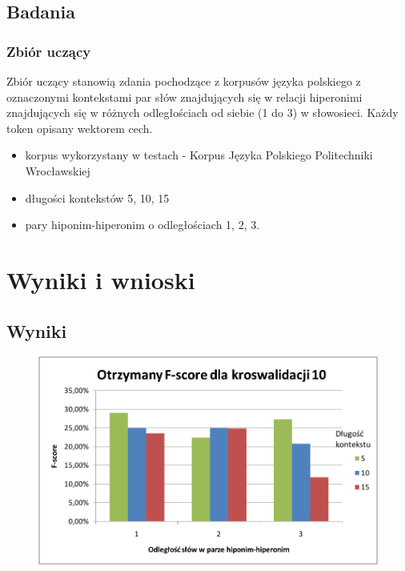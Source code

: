 \documentclass[a4paper,10pt]{report}
\begin{document}
\section{Badania}

\subsection{Zbiór uczący}

Zbiór uczący stanowią zdania pochodzące z korpusów języka polskiego z oznaczonymi kontekstami par słów znajdujących się w relacji hiperonimi znajdujących się w różnych odległościach od siebie (1 do 3) w słowosieci. Każdy token opisany wektorem cech.

\begin{itemize}
 \item korpus wykorzystany w testach - Korpus Języka Polskiego Politechniki Wrocławskiej
 \item długości kontekstów 5, 10, 15
 \item pary hiponim-hiperonim o odległościach 1, 2, 3.
\end{itemize}

\chapter{Wyniki i wnioski}

\section{Wyniki}

\begin{figure}[h]
\centering
 \includegraphics[width=13cm]{img/image003.png}
 \caption{}
\label{fig:wykres}
\end{figure} 
\end{document}
